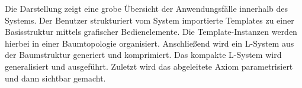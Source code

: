 Die Darstellung zeigt eine grobe Übersicht der Anwendungsfälle innerhalb des Systems.
Der Benutzer strukturiert vom System importierte Templates zu einer Basisstruktur mittels grafischer Bedienelemente.
Die Template-Instanzen werden hierbei in einer Baumtopologie organisiert.
Anschließend wird ein L-System aus der Baumstruktur generiert und komprimiert.
Das kompakte L-System wird generalisiert und ausgeführt.
Zuletzt wird das abgeleitete Axiom parametrisiert und dann sichtbar gemacht.